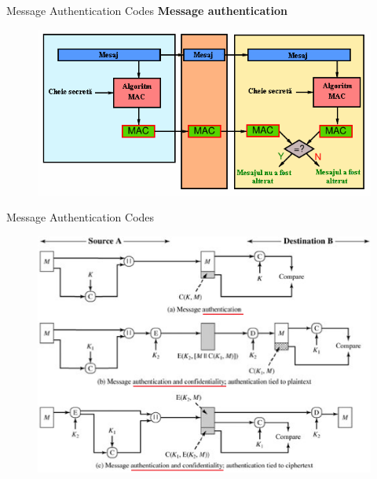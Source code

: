 \documentclass[pdf]{beamer}
\begin{document}
\begin{frame}{Message Authentication Codes}
\textbf{Message authentication}
\begin{figure}[t]
\centering
\includegraphics[scale=0.9]{Images/MAC2}
\end{figure}
\end{frame}



\begin{frame}{Message Authentication Codes}
\begin{figure}[t]
\centering
\includegraphics[scale=0.53]{Images/macuse}
\end{figure}
\end{frame}
\end{document}
